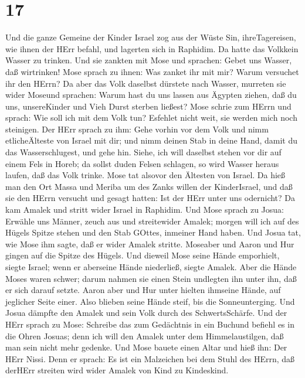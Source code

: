 \hypertarget{section-16}{%
\section{17}\label{section-16}}

 Und die ganze Gemeine der Kinder Israel zog aus der Wüste
Sin, ihreTagereisen, wie ihnen der HErr befahl, und lagerten sich in
Raphidim. Da hatte das Volkkein Wasser zu trinken.  Und sie
zankten mit Mose und sprachen: Gebet uns Wasser, daß wirtrinken! Mose
sprach zu ihnen: Was zanket ihr mit mir? Warum versuchet ihr den HErrn?
 Da aber das Volk daselbst dürstete nach Wasser, murreten
sie wider Moseund sprachen: Warum hast du uns lassen aus Ägypten ziehen,
daß du uns, unsereKinder und Vieh Durst sterben ließest? 
Mose schrie zum HErrn und sprach: Wie soll ich mit dem Volk tun?
Esfehlet nicht weit, sie werden mich noch steinigen.  Der
HErr sprach zu ihm: Gehe vorhin vor dem Volk und nimm etlicheÄlteste von
Israel mit dir; und nimm deinen Stab in deine Hand, damit du das
Wasserschlugest, und gehe hin.  Siehe, ich will daselbst
stehen vor dir auf einem Fels in Horeb; da sollst duden Felsen schlagen,
so wird Wasser heraus laufen, daß das Volk trinke. Mose tat alsovor den
Ältesten von Israel.  Da hieß man den Ort Massa und Meriba
um des Zanks willen der KinderIsrael, und daß sie den HErrn versucht und
gesagt hatten: Ist der HErr unter uns odernicht?  Da kam
Amalek und stritt wider Israel in Raphidim.  Und Mose sprach
zu Josua: Erwähle uns Männer, zeuch aus und streitewider Amalek; morgen
will ich auf des Hügels Spitze stehen und den Stab GOttes, inmeiner Hand
haben.  Und Josua tat, wie Mose ihm sagte, daß er wider
Amalek stritte. Moseaber und Aaron und Hur gingen auf die Spitze des
Hügels.  Und dieweil Mose seine Hände emporhielt, siegte
Israel; wenn er aberseine Hände niederließ, siegte Amalek. 
Aber die Hände Moses waren schwer; darum nahmen sie einen Stein
undlegten ihn unter ihn, daß er sich darauf setzte. Aaron aber und Hur
unter hielten ihmseine Hände, auf jeglicher Seite einer. Also blieben
seine Hände steif, bis die Sonneunterging.  Und Josua
dämpfte den Amalek und sein Volk durch des SchwertsSchärfe.
 Und der HErr sprach zu Mose: Schreibe das zum Gedächtnis
in ein Buchund befiehl es in die Ohren Josuas; denn ich will den Amalek
unter dem Himmelaustilgen, daß man sein nicht mehr gedenke.
 Und Mose bauete einen Altar und hieß ihn: Der HErr Nissi.
 Denn er sprach: Es ist ein Malzeichen bei dem Stuhl des
HErrn, daß derHErr streiten wird wider Amalek von Kind zu Kindeskind.

